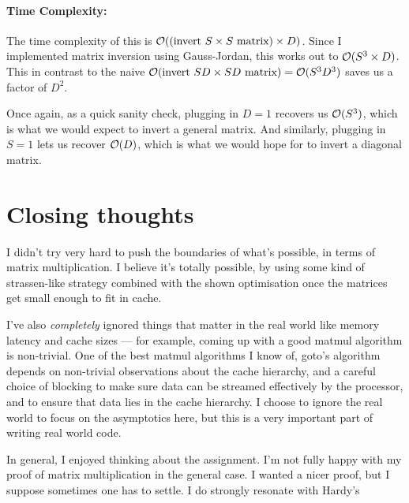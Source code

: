 \documentclass[11pt]{article}
\begin{document}
\paragraph{\textbf{Time Complexity:}}
The time complexity of this is $\mathcal{O}((\text{invert $S \times S$ matrix}) \times D)$.
Since I implemented matrix inversion using Gauss-Jordan, this works out to
$\mathcal{O}(S^3 \times D)$. This in contrast to the naive 
$\mathcal{O}(\text{invert $SD \times SD$ matrix}) = \mathcal{O}(S^3 D^3)$ saves us a factor of $D^2$.

Once again, as a quick sanity check, plugging in $D = 1$ recovers us $\mathcal{O}(S^3)$, which
is what we would expect to invert a general matrix. And similarly, plugging in
$S = 1$ lets us recover $\mathcal{O}(D)$, which is what we would hope for to invert
a diagonal matrix.

\section{Closing thoughts}
I didn't try very hard to push the boundaries of what's possible, in terms 
of matrix multiplication. I believe it's totally possible, by using some kind
of strassen-like strategy combined with the shown optimisation once the
matrices get small enough to fit in cache.

I've also \textit{completely} ignored things that matter in the real world
like memory latency and cache sizes --- for example, coming up with a good
matmul algorithm is non-trivial. One of the best matmul algorithms I know of,
goto's algorithm depends on non-trivial observations about the cache hierarchy,
and a careful choice of blocking to make sure data can be streamed effectively
by the processor, and to ensure that data lies in the cache hierarchy. I
choose to ignore the real world to focus on the asymptotics here, but this
is a very important part of writing real world code.

In general, I enjoyed thinking about the assignment. I'm not fully happy with
my proof of matrix multiplication in the general case. I wanted a nicer proof,
but I suppose sometimes one has to settle. I do strongly resonate with Hardy's
\end{document}
